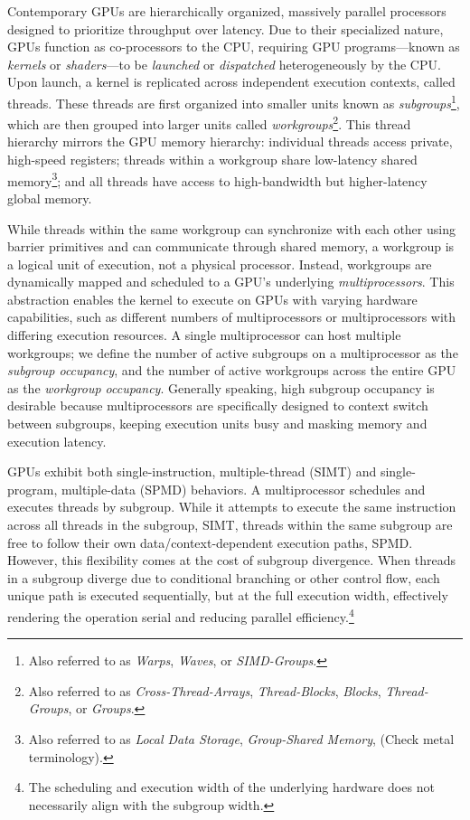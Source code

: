 \documentclass[sigconf]{acmart}
\begin{document}
Contemporary GPUs are hierarchically organized, massively parallel processors designed to prioritize throughput over latency. Due to their specialized nature, GPUs function as co-processors to the CPU, requiring GPU programs—known as \emph{kernels} or \emph{shaders}—to be \emph{launched} or \emph{dispatched} heterogeneously by the CPU\@. Upon launch, a kernel is replicated across independent execution contexts, called threads. These threads are first organized into smaller units known as \emph{subgroups}\footnote{Also referred to as \emph{Warps}, \emph{Waves}, or \emph{SIMD-Groups}.}, which are then grouped into larger units called \emph{workgroups}\footnote{Also referred to as \emph{Cross-Thread-Arrays}, \emph{Thread-Blocks}, \emph{Blocks}, \emph{Thread-Groups}, or \emph{Groups}.}. This thread hierarchy mirrors the GPU memory hierarchy: individual threads access private, high-speed registers; threads within a workgroup share low-latency shared memory\footnote{Also referred to as \emph{Local Data Storage}, \emph{Group-Shared Memory}, (Check metal terminology).}; and all threads have access to high-bandwidth but higher-latency global memory.

While threads within the same workgroup can synchronize with each other using barrier primitives and can communicate through shared memory, a workgroup is a logical unit of execution, not a physical processor. Instead, workgroups are dynamically mapped and scheduled to a GPU's underlying \emph{multiprocessors}. This abstraction enables the kernel to execute on GPUs with varying hardware capabilities, such as different numbers of multiprocessors or multiprocessors with differing execution resources. A single multiprocessor can host multiple workgroups; we define the number of active subgroups on a multiprocessor as the \emph{subgroup occupancy}, and the number of active workgroups across the entire GPU as the \emph{workgroup occupancy}. Generally speaking, high subgroup occupancy is desirable because multiprocessors are specifically designed to context switch between subgroups, keeping execution units busy and masking memory and execution latency.

GPUs exhibit both single-instruction, multiple-thread (SIMT) and single-program, multiple-data (SPMD) behaviors. A multiprocessor schedules and executes threads by subgroup. While it attempts to execute the same instruction across all threads in the subgroup, SIMT, threads within the same subgroup are free to follow their own data/context-dependent execution paths, SPMD\@. However, this flexibility comes at the cost of subgroup divergence. When threads in a subgroup diverge due to conditional branching or other control flow, each unique path is executed sequentially, but at the full execution width, effectively rendering the operation serial and reducing parallel efficiency.\footnote{The scheduling and execution width of the underlying hardware does not necessarily align with the subgroup width.}
\end{document}
